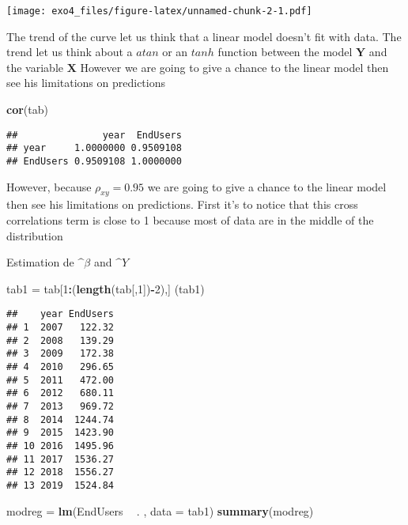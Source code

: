 \documentclass[
]{article}
\newenvironment{Shaded}{\begin{snugshade}}{\end{snugshade}}
\newcommand{\DataTypeTok}[1]{\textcolor[rgb]{0.13,0.29,0.53}{#1}}
\newcommand{\DecValTok}[1]{\textcolor[rgb]{0.00,0.00,0.81}{#1}}
\newcommand{\KeywordTok}[1]{\textcolor[rgb]{0.13,0.29,0.53}{\textbf{#1}}}
\newcommand{\NormalTok}[1]{#1}
\newcommand{\OperatorTok}[1]{\textcolor[rgb]{0.81,0.36,0.00}{\textbf{#1}}}
\newcommand{\StringTok}[1]{\textcolor[rgb]{0.31,0.60,0.02}{#1}}
\begin{document}
\texttt{[image: exo4\_files/figure-latex/unnamed-chunk-2-1.pdf]}

The trend of the curve let us think that a linear model doesn't fit with
data. The trend let us think about a \(atan\) or an \(tanh\) function
between the model \(\mathbf{Y}\) and the variable \(\mathbf{X}\) However
we are going to give a chance to the linear model then see his
limitations on predictions

\begin{Shaded}
\begin{Highlighting}[]
\KeywordTok{cor}\NormalTok{(tab)}
\end{Highlighting}
\end{Shaded}

\begin{verbatim}
##               year  EndUsers
## year     1.0000000 0.9509108
## EndUsers 0.9509108 1.0000000
\end{verbatim}

However, because \(\rho_{xy} = 0.95\) we are going to give a chance to
the linear model then see his limitations on predictions. First it's to
notice that this cross correlations term is close to 1 because most of
data are in the middle of the distribution


Estimation de \(\^{\beta}\) and \(\^{Y}\)

\begin{Shaded}
\begin{Highlighting}[]
\NormalTok{tab1 =}\StringTok{ }\NormalTok{tab[}\DecValTok{1}\OperatorTok{:}\NormalTok{(}\KeywordTok{length}\NormalTok{(tab[,}\DecValTok{1}\NormalTok{])}\OperatorTok{-}\DecValTok{2}\NormalTok{),]}
\NormalTok{(tab1)}
\end{Highlighting}
\end{Shaded}

\begin{verbatim}
##    year EndUsers
## 1  2007   122.32
## 2  2008   139.29
## 3  2009   172.38
## 4  2010   296.65
## 5  2011   472.00
## 6  2012   680.11
## 7  2013   969.72
## 8  2014  1244.74
## 9  2015  1423.90
## 10 2016  1495.96
## 11 2017  1536.27
## 12 2018  1556.27
## 13 2019  1524.84
\end{verbatim}

\begin{Shaded}
\begin{Highlighting}[]
\NormalTok{modreg =}\StringTok{ }\KeywordTok{lm}\NormalTok{(EndUsers }\OperatorTok{~}\StringTok{ }\NormalTok{. , }\DataTypeTok{data =}\NormalTok{ tab1)}
\KeywordTok{summary}\NormalTok{(modreg)}
\end{Highlighting}
\end{Shaded}
\end{document}
